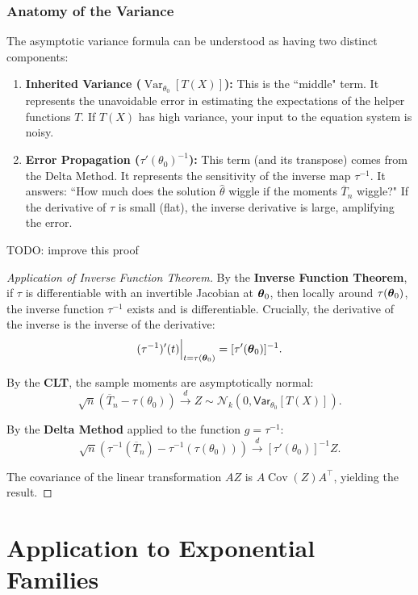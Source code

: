 \subsubsection{Anatomy of the Variance}
The asymptotic variance formula can be understood as having two distinct components:
\begin{enumerate}
    \item \textbf{Inherited Variance ($\operatorname{Var}_{\theta_0}[T(X)]$):} This is the ``middle" term. It represents the unavoidable error in estimating the expectations of the helper functions $T$. If $T(X)$ has high variance, your input to the equation system is noisy.
    \item \textbf{Error Propagation ($\tau'(\theta_0)^{-1}$):} This term (and its transpose) comes from the Delta Method. It represents the sensitivity of the inverse map $\tau^{-1}$. It answers: ``How much does the solution $\hat{\theta}$ wiggle if the moments $\overline{T}_n$ wiggle?" If the derivative of $\tau$ is small (flat), the inverse derivative is large, amplifying the error.
\end{enumerate}

TODO: improve this proof
\begin{proof}[Application of Inverse Function Theorem]
By the \textbf{Inverse Function Theorem}, if $\tau$ is differentiable with an invertible Jacobian at $\boldsymbol{\theta}_0$, then locally around $\tau(\boldsymbol{\theta}_0)$, the inverse function $\tau^{-1}$ exists and is differentiable. Crucially, the derivative of the inverse is the inverse of the derivative:
\[ (\tau^{-1})'(t) \Big|_{t=\tau(\boldsymbol{\theta}_0)} = [\tau'(\boldsymbol{\theta}_0)]^{-1}. \]

By the \textbf{CLT}, the sample moments are asymptotically normal:
   \[ \sqrt{n} (\overline{T}_n - \tau(\theta_0)) \xrightarrow{d} Z \sim \mathcal{N}_k(0, \mathsf{Var}_{\theta_0}[T(X)]). \]

By the \textbf{Delta Method} applied to the function $g = \tau^{-1}$:
   \[ \sqrt{n}(\tau^{-1}(\overline{T}_n) - \tau^{-1}(\tau(\theta_0))) \xrightarrow{d} [\tau'(\theta_0)]^{-1} Z. \]

The covariance of the linear transformation $AZ$ is $A \operatorname{Cov}(Z) A^\top$, yielding the result.
\end{proof}

\section{Application to Exponential Families}

